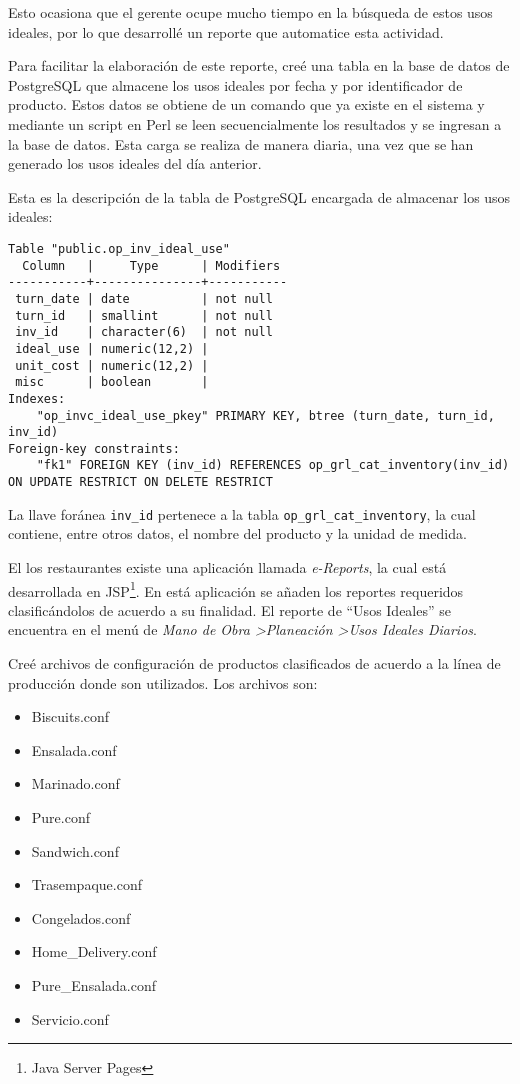Esto ocasiona que el gerente ocupe mucho tiempo en la búsqueda de estos usos ideales, por lo que desarrollé un reporte que automatice esta actividad.

Para facilitar la elaboración de este reporte, creé una tabla en la base de datos de PostgreSQL que almacene los usos ideales por fecha y por identificador de producto. Estos datos se obtiene de un comando que ya existe en el sistema y mediante un script en Perl se leen secuencialmente los resultados y se ingresan a la base de datos. Esta carga se realiza de manera diaria, una vez que se han generado los usos ideales del día anterior. 

Esta es la descripción de la tabla de PostgreSQL encargada de almacenar los usos ideales:

\begin{Verbatim}[fontsize=\tiny]
    Table "public.op_inv_ideal_use"
  Column   |     Type      | Modifiers 
-----------+---------------+-----------
 turn_date | date          | not null
 turn_id   | smallint      | not null
 inv_id    | character(6)  | not null
 ideal_use | numeric(12,2) | 
 unit_cost | numeric(12,2) | 
 misc      | boolean       | 
Indexes:
    "op_invc_ideal_use_pkey" PRIMARY KEY, btree (turn_date, turn_id, inv_id)
Foreign-key constraints:
    "fk1" FOREIGN KEY (inv_id) REFERENCES op_grl_cat_inventory(inv_id) ON UPDATE RESTRICT ON DELETE RESTRICT
\end{Verbatim}

La llave foránea \texttt{inv\_id} pertenece a la tabla \texttt{op\_grl\_cat\_inventory}, la cual contiene, entre otros datos, el nombre del producto y la unidad de medida.

El los restaurantes existe una aplicación llamada \textit{e-Reports}\pageref{sec:ereports}, la cual está desarrollada en JSP\footnote{Java Server Pages}. En está aplicación se añaden los reportes requeridos clasificándolos de acuerdo a su finalidad. El reporte de ``Usos Ideales'' se  encuentra en el menú de \textit{Mano de Obra \textendash\textgreater Planeación \textendash\textgreater Usos Ideales Diarios}.

Creé archivos de configuración de productos clasificados de acuerdo a la línea de producción donde son utilizados. Los archivos son:

\begin{itemize}
 \item Biscuits.conf
 \item Ensalada.conf
 \item Marinado.conf
 \item Pure.conf
 \item Sandwich.conf
 \item Trasempaque.conf
 \item Congelados.conf  
 \item Home\_Delivery.conf
 \item Pure\_Ensalada.conf  
 \item Servicio.conf
\end{itemize}

